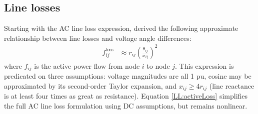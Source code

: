 \documentclass[conference]{IEEEtran}
\begin{document}


\subsection{Line losses}
Starting with the AC line loss expression, \cite{almassalkhi2014} derived the following approximate relationship between line losses and voltage angle differences:
\begin{align}
\label{LL:activeLoss}
f_{ij}^{\text{loss}} &\approx r_{ij}\left(\frac{\theta_{ij}}{x_{ij}}\right)^2
\end{align}
where $f_{ij}$ is the active power flow from node $i$ to node $j$. This expression is predicated on three assumptions: voltage magnitudes are all 1 pu, cosine may be approximated by its second-order Taylor expansion, and $x_{ij} \geq 4r_{ij}$ (line reactance is at least four times as great as resistance). Equation \eqref{LL:activeLoss} simplifies the full AC line loss formulation using DC assumptions, but remains nonlinear.
\end{document}
